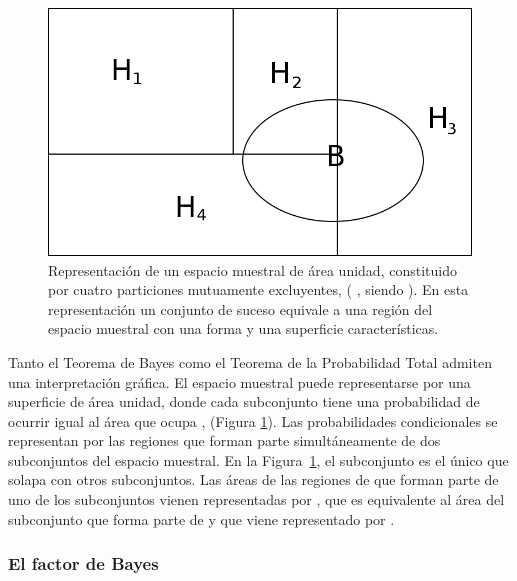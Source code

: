 \begin{figure}[htb]
    \begin{center}
         \includegraphics[width=14cm]{1_Introduccion/conjuntos.png}
    \end{center}
    \caption{\small Representación de un espacio muestral \maths{\Omega} de área unidad, constituido por cuatro particiones mutuamente excluyentes, ( ,   siendo ). En esta representación un conjunto de suceso  equivale a una región del espacio muestral con una forma y una superficie características.} 
    
    \label{fig:conjuntos}
\end{figure}

Tanto el Teorema de Bayes como el Teorema de la Probabilidad Total admiten una interpretación gráfica. El espacio muestral \maths{\Omega} puede representarse por una superficie de área unidad, donde cada subconjunto  tiene una probabilidad de ocurrir igual al área que ocupa  , (Figura \ref{fig:conjuntos}). Las probabilidades condicionales se representan por las regiones que forman parte simultáneamente de dos subconjuntos del espacio muestral. En la Figura~\ref{fig:conjuntos}, el subconjunto  es el único que solapa con otros subconjuntos. Las áreas de las regiones de  que forman parte de uno de los subconjuntos  vienen representadas por , que es equivalente al área del subconjunto  que forma parte de  y que viene representado por .

\newpage

\subsubsection{El factor de Bayes}

